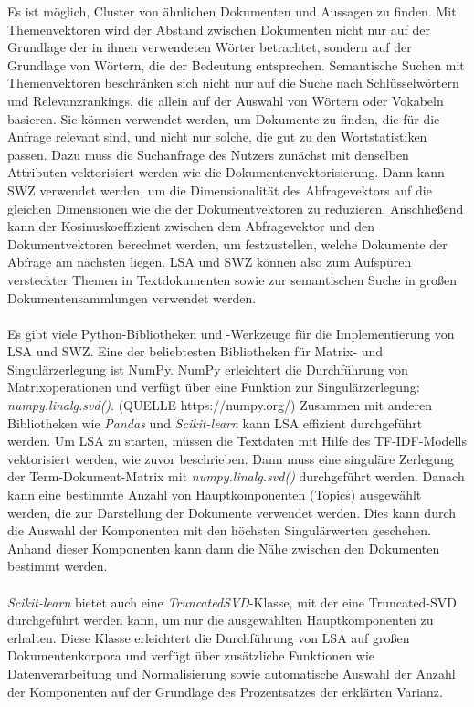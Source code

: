 Es ist möglich, Cluster von ähnlichen Dokumenten und Aussagen zu finden. 
Mit Themenvektoren wird der Abstand zwischen Dokumenten nicht nur auf der Grundlage der in ihnen verwendeten Wörter betrachtet, sondern auf der Grundlage von Wörtern, die der Bedeutung entsprechen. 
Semantische Suchen mit Themenvektoren beschränken sich nicht nur auf die Suche nach Schlüsselwörtern und Relevanzrankings, die allein auf der Auswahl von Wörtern oder Vokabeln basieren. 
Sie können verwendet werden, um Dokumente zu finden, die für die Anfrage relevant sind, und nicht nur solche, die gut zu den Wortstatistiken passen. 
Dazu muss die Suchanfrage des Nutzers zunächst mit denselben Attributen vektorisiert werden wie die Dokumentenvektorisierung. 
Dann kann \ac{SWZ} verwendet werden, um die Dimensionalität des Abfragevektors auf die gleichen Dimensionen wie die der Dokumentvektoren zu reduzieren. 
Anschließend kann der Kosinuskoeffizient zwischen dem Abfragevektor und den Dokumentvektoren berechnet werden, um festzustellen, welche Dokumente der Abfrage am nächsten liegen. 
\ac{LSA} und \ac{SWZ} können also zum Aufspüren versteckter Themen in Textdokumenten sowie zur semantischen Suche in großen Dokumentensammlungen verwendet werden. \cite{lane_natural_2019}\\\\
Es gibt viele Python-Bibliotheken und -Werkzeuge für die Implementierung von \ac{LSA} und \ac{SWZ}. 
Eine der beliebtesten Bibliotheken für Matrix- und Singulärzerlegung ist NumPy. 
NumPy erleichtert die Durchführung von Matrixoperationen und verfügt über eine Funktion zur Singulärzerlegung: \textit{numpy.linalg.svd()}. (QUELLE https://numpy.org/)
Zusammen mit anderen Bibliotheken wie \textit{Pandas} und \textit{Scikit-learn} kann \ac{LSA} effizient durchgeführt werden. 
Um \ac{LSA} zu starten, müssen die Textdaten mit Hilfe des \ac{TF-IDF}-Modells vektorisiert werden, wie zuvor beschrieben. 
Dann muss eine singuläre Zerlegung der Term-Dokument-Matrix mit \textit{numpy.linalg.svd()} durchgeführt werden. 
Danach kann eine bestimmte Anzahl von Hauptkomponenten (Topics) ausgewählt werden, die zur Darstellung der Dokumente verwendet werden. 
Dies kann durch die Auswahl der Komponenten mit den höchsten Singulärwerten geschehen. 
Anhand dieser Komponenten kann dann die Nähe zwischen den Dokumenten bestimmt werden.\\\\ 
\textit{Scikit-learn} bietet auch eine \textit{TruncatedSVD}-Klasse, mit der eine Truncated-\ac{SVD} durchgeführt werden kann, um nur die ausgewählten Hauptkomponenten zu erhalten. 
Diese Klasse erleichtert die Durchführung von \ac{LSA} auf großen Dokumentenkorpora und verfügt über zusätzliche Funktionen wie Datenverarbeitung und Normalisierung sowie automatische Auswahl der Anzahl der Komponenten auf der Grundlage des Prozentsatzes der erklärten Varianz. \cite{scikit-learn}

